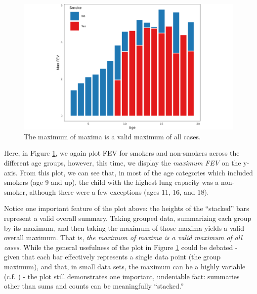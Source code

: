 \documentclass[
]{book}
\theoremstyle{definition}
\theoremstyle{definition}
\theoremstyle{definition}
\theoremstyle{definition}
\theoremstyle{remark}
\begin{document}
\begin{figure}

{\centering \includegraphics[width=1\linewidth,height=1\textheight]{./figures/grammar-barplot-maximums} 

}

\caption{The maximum of maxima is a valid maximum of all cases.}\label{fig:grammar-barplot-maximums}
\end{figure}

Here, in Figure \ref{fig:grammar-barplot-maximums}, we again plot FEV for smokers and non-smokers across the different age groups, however, this time, we display the \emph{maximum FEV} on the y-axis. From this plot, we can see that, in most of the age categories which included smokers (age 9 and up), the child with the highest lung capacity was a non-smoker, although there were a few exceptions (ages 11, 16, and 18).

Notice one important feature of the plot above: the heights of the ``stacked'' bars represent a valid overall summary. Taking grouped data, summarizing each group by its maximum, and then taking the maximum of those maxima yields a valid overall maximum. That is, \emph{the maximum of maxima is a valid maximum of all cases}. While the general usefulness of the plot in Figure \ref{fig:grammar-barplot-maximums} could be debated - given that each bar effectively represents a single data point (the group maximum), and that, in small data sets, the maximum can be a highly variable (c.f. ) - the plot still demonstrates one important, undeniable fact: summaries other than sums and counts can be meaningfully ``stacked.''
\end{document}
